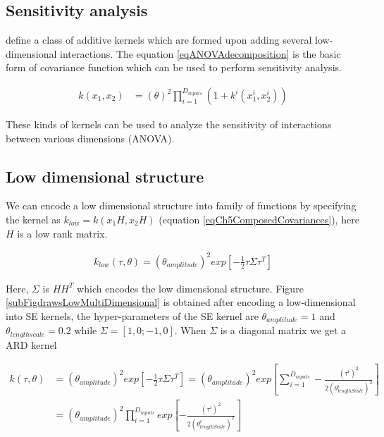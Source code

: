 \subsection{Sensitivity analysis}
\cite{duvenaud2011additive, durrande2013anova, chastaing2015anova} define a class of additive kernels which are formed upon adding several low-dimensional interactions. The equation \ref{eqANOVAdecomposition} is the basic form of covariance function which can be used to perform sensitivity analysis.

\begin{align}
k(x_{1}, x_{2}) & = (\theta)^2 \prod_{i=1}^{D_{inputs}} \left(1 + k^{i}(x_{1}^{i}, x_{2}^{i})\right) \label{eqANOVAdecomposition} 
\end{align}

These kinds of kernels can be used to analyze the sensitivity of interactions between various dimensions (ANOVA). 

\subsection{Low dimensional structure}
We can encode a low dimensional structure into family of functions by specifying the kernel as $k_{low} = k(x_{1}H, x_{2}H)$ (equation \ref{eqCh5ComposedCovariances}), here $H$ is a low rank matrix. 

\begin{align}\label{eq:SELowDimensional}
k_{low}(\tau, \theta) = (\theta_{amplitude})^2  exp\left [  -\frac{1}{2}\tau\Sigma\tau^T \right ] 
\end{align}

Here, $\Sigma$ is $HH^T$ which encodes the low dimensional structure. Figure \ref{subFigdrawsLowMultiDimensional} is obtained after encoding a low-dimensional into SE kernels, the hyper-parameters of the SE kernel are $\theta_{amplitude}=1$ and $\theta_{lengthscale}=0.2$ while $\Sigma = [1, 0; -1, 0]$. When $\Sigma$ is a diagonal matrix we get a ARD kernel

\begin{equation}
\begin{aligned}
k(\tau, \theta) & = (\theta_{amplitude})^2  exp\left [  -\frac{1}{2}\tau\Sigma\tau^T \right ] = 
(\theta_{amplitude})^2  exp\left [ \sum_{i=1}^{D_{inputs}} -\frac{(\tau^{i})^2}{2(\theta_{lengthScale}^{i})^2} \right ] \\
& = (\theta_{amplitude})^2 \prod_{i=1}^{D_{inputs}}  exp\left [ -\frac{(\tau^{i})^2}{2(\theta_{lengthScale}^{i})^2} \right ]
\end{aligned}
\end{equation}

